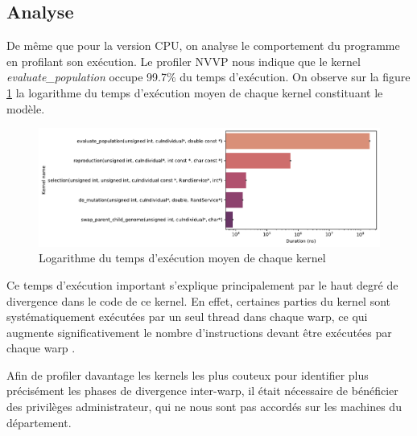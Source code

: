 \documentclass[a4paper, 10pt, twoside]{article}
\begin{document}
\subsection{Analyse}

De même que pour la version CPU, on analyse le comportement du programme en profilant son exécution. Le profiler NVVP nous indique que le kernel \textit{evaluate\_population} occupe 99.7\% du temps d'exécution. On observe sur la figure \ref{fig:kernel/timings} la logarithme du temps d'exécution moyen de chaque kernel constituant le modèle.

\begin{figure}[htp]
	\centering
	\includegraphics[width=0.7\linewidth]{img/kernel_timings.pdf}
	\caption{Logarithme du temps d'exécution moyen de chaque kernel}
	\label{fig:kernel/timings}
\end{figure}

Ce temps d'exécution important s'explique principalement par le haut degré de divergence dans le code de ce kernel. En effet, certaines parties du kernel sont systématiquement exécutées par un seul thread dans chaque warp, ce qui augmente significativement le nombre d'instructions devant être exécutées par chaque warp \cite{nvidia/branching}.

Afin de profiler davantage les kernels les plus couteux pour identifier plus précisément les phases de divergence inter-warp, il était nécessaire de bénéficier des privilèges administrateur, qui ne nous sont pas accordés sur les machines du département.



\end{document}
